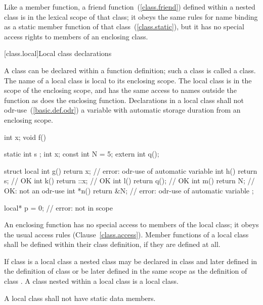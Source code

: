 \pnum
{}%
Like a member function, a friend function~(\ref{class.friend}) defined
within a nested class is in the lexical scope of that class; it obeys
the same rules for name binding as a static member function of that
class~(\ref{class.static}), but it has no special access rights to
members of an enclosing class.

[class.local]{Local class declarations}
%
%

\pnum
A class can be declared within a function definition; such a class is
called a  class. The name of a local class is local to
its enclosing scope.
%
The local class is in the scope of the enclosing scope, and has the same
access to names outside the function as does the enclosing function.
Declarations in a local class
shall not odr-use~(\ref{basic.def.odr}) a variable with automatic storage
duration from an
enclosing scope.
\enterexample
{}%
\begin{codeblock}
int x;
void f() {
  static int s ;
  int x;
  const int N = 5;
  extern int q();

  struct local {
    int g() { return x; }       // error: odr-use of automatic variable 
    int h() { return s; }       // OK
    int k() { return ::x; }     // OK
    int l() { return q(); }     // OK
    int m() { return N; }       // OK: not an odr-use
    int *n() { return &N; }     // error: odr-use of automatic variable 
  };
}

local* p = 0;                   // error:  not in scope
\end{codeblock}
\exitexample

\pnum
An enclosing function has no special access to members of the local
class; it obeys the usual access rules (Clause~\ref{class.access}).
%
Member functions of a local class shall be defined within their class
definition, if they are defined at all.

\pnum
{}%
If class  is a local class a nested class  may be
declared in class  and later defined in the definition of class
 or be later defined in the same scope as the definition of
class .
%
A class nested within
a local class is a local class.

\pnum
A local class shall not have static data members.


